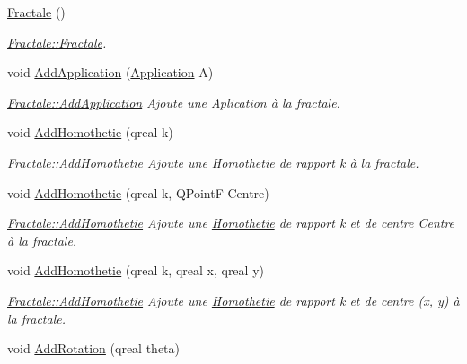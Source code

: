 \begin{DoxyCompactItemize}
\item 
\hyperlink{class_fractale_a0d3df9f1e22b8e83271406a5cf1d4f93}{Fractale} ()
\begin{DoxyCompactList}\small\item\em \hyperlink{class_fractale_a0d3df9f1e22b8e83271406a5cf1d4f93}{Fractale\+::\+Fractale}. \end{DoxyCompactList}\item 
void \hyperlink{class_fractale_a395f48f89bd58d7eb5bee40eb9ebb23e}{Add\+Application} (\hyperlink{class_application}{Application} A)
\begin{DoxyCompactList}\small\item\em \hyperlink{class_fractale_a395f48f89bd58d7eb5bee40eb9ebb23e}{Fractale\+::\+Add\+Application} Ajoute une Aplication à la fractale. \end{DoxyCompactList}\item 
void \hyperlink{class_fractale_a41004fff17f45f2ad3fb6c8ae15f0697}{Add\+Homothetie} (qreal k)
\begin{DoxyCompactList}\small\item\em \hyperlink{class_fractale_a41004fff17f45f2ad3fb6c8ae15f0697}{Fractale\+::\+Add\+Homothetie} Ajoute une \hyperlink{class_homothetie}{Homothetie} de rapport k à la fractale. \end{DoxyCompactList}\item 
void \hyperlink{class_fractale_a4f66b9d2056c70cbec0904750cc0efbd}{Add\+Homothetie} (qreal k, Q\+Point\+F Centre)
\begin{DoxyCompactList}\small\item\em \hyperlink{class_fractale_a41004fff17f45f2ad3fb6c8ae15f0697}{Fractale\+::\+Add\+Homothetie} Ajoute une \hyperlink{class_homothetie}{Homothetie} de rapport k et de centre Centre à la fractale. \end{DoxyCompactList}\item 
void \hyperlink{class_fractale_ae8645aad7d5a2191fcef0354edf45991}{Add\+Homothetie} (qreal k, qreal x, qreal y)
\begin{DoxyCompactList}\small\item\em \hyperlink{class_fractale_a41004fff17f45f2ad3fb6c8ae15f0697}{Fractale\+::\+Add\+Homothetie} Ajoute une \hyperlink{class_homothetie}{Homothetie} de rapport k et de centre (x, y) à la fractale. \end{DoxyCompactList}\item 
void \hyperlink{class_fractale_a2a222da66f021b2cdd63d67f9ec0fb90}{Add\+Rotation} (qreal theta)

\end{DoxyCompactItemize}
